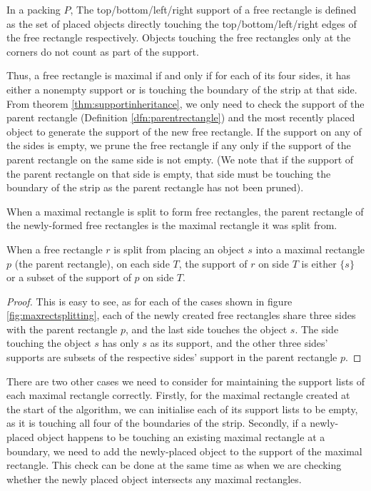 \documentclass{article}
\begin{document}
\begin{defn}
\begin{defn}
\begin{dfn}
In a packing $P$, The top/bottom/left/right support of a free rectangle is defined as the set of placed objects directly touching the top/bottom/left/right edges of the free rectangle respectively. Objects touching the free rectangles only at the corners do not count as part of the support.
\begin{dfn}

Thus, a free rectangle is maximal if and only if for each of its four sides, it has either a nonempty support or is touching the boundary of the strip at that side. From theorem \ref{thm:supportinheritance}, we only need to check the support of the parent rectangle (Definition \ref{dfn:parentrectangle}) and the most recently placed object to generate the support of the new free rectangle. If the support on any of the sides is empty, we prune the free rectangle if any only if the support of the parent rectangle on the same side is not empty. (We note that if the support of the parent rectangle on that side is empty, that side must be touching the boundary of the strip as the parent rectangle has not been pruned).

\begin{dfn}
\label{dfn:parentrectangle}
When a maximal rectangle is split to form free rectangles, the parent rectangle of the newly-formed free rectangles is the maximal rectangle it was split from.
\end{dfn}

\begin{thm}
\label{thm:supportinheritance}
When a free rectangle $r$ is split from placing an object $s$ into a maximal rectangle $p$ (the parent rectangle), on each side $T$, the support of $r$ on side $T$ is either $\{s\}$ or a subset of the support of $p$ on side $T$.
\end{thm}
\begin{proof}
This is easy to see, as for each of the cases shown in figure \ref{fig:maxrectsplitting}, each of the newly created free rectangles share three sides with the parent rectangle $p$, and the last side touches the object $s$. The side touching the object $s$ has only $s$ as its support, and the other three sides' supports are subsets of the respective sides' support in the parent rectangle $p$.
\end{proof}

There are two other cases we need to consider for maintaining the support lists of each maximal rectangle correctly. Firstly, for the maximal rectangle created at the start of the algorithm, we can initialise each of its support lists to be empty, as it is touching all four of the boundaries of the strip. Secondly, if a newly-placed object happens to be touching an existing maximal rectangle at a boundary, we need to add the newly-placed object to the support of the maximal rectangle. This check can be done at the same time as when we are checking whether the newly placed object intersects any maximal rectangles.\\


\end{dfn}
\end{dfn}
\end{defn}
\end{defn}
\end{document}
